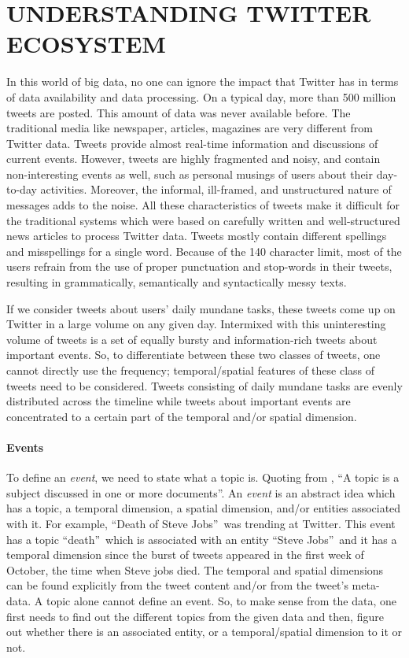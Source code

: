 \section{\uppercase{Understanding Twitter Ecosystem}}
In this world of big data, no one can ignore the impact that Twitter has in terms of data availability and data processing. On a typical day, more than 500 million tweets are posted. This amount of data was never available before. The traditional media like newspaper, articles, magazines are very different from Twitter data. Tweets provide almost real-time information and discussions of current events. However, tweets are highly fragmented and noisy, and contain non-interesting events as well, such as personal musings of users about their day-to-day activities. Moreover, the informal, ill-framed, and unstructured nature of messages adds to the noise. All these characteristics of tweets make it difficult for the traditional systems which were based on carefully written and well-structured news articles to process Twitter data. Tweets mostly contain different spellings and misspellings for a single word. Because of the 140 character limit, most of the users refrain from the use of proper punctuation and stop-words in their tweets, resulting in grammatically, semantically and syntactically messy texts.

If we consider tweets about users' daily mundane tasks, these tweets come up on Twitter in a large volume on any given day. Intermixed with this uninteresting volume of tweets is a set of equally bursty and information-rich tweets about important events. So, to differentiate between these two classes of tweets, one cannot directly use the frequency; temporal/spatial features of these class of tweets need to be considered. Tweets consisting of daily mundane tasks are evenly distributed across the timeline while tweets about important events are concentrated to a certain part of the temporal and/or spatial dimension.

\paragraph{Events}
To define an \emph{event}, we need to state what a topic is. Quoting from \cite{zhao2011comparing}, \textquotedblleft A topic is a subject discussed in one or more documents\textquotedblright. An \emph{event} is an abstract idea which has a topic, a temporal dimension, a spatial dimension, and/or entities associated with it. For example, \textquotedblleft Death of Steve Jobs\textquotedblright~was trending at Twitter. This event has a topic \textquotedblleft death\textquotedblright~which is associated with an entity \textquotedblleft Steve Jobs\textquotedblright~and it has a temporal dimension since the burst of tweets appeared in the first week of October, the time when Steve jobs died. The temporal and spatial dimensions can be found explicitly from the tweet content and/or from the tweet's meta-data. A topic alone cannot define an event. So, to make sense from the data, one first needs to find out the different topics from the given data and then, figure out whether there is an associated entity, or a temporal/spatial dimension to it or not.